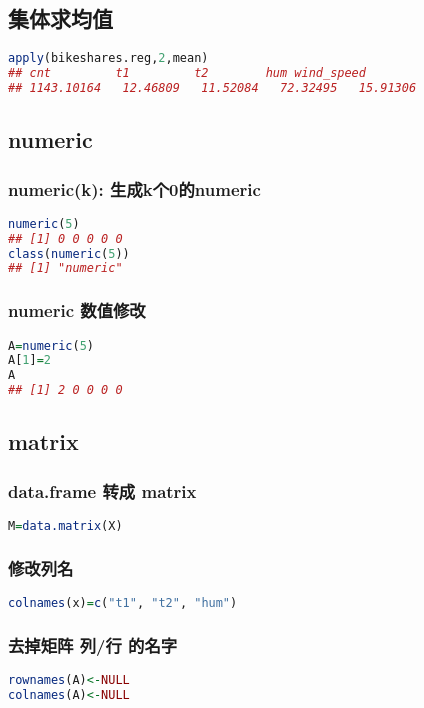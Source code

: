 \documentclass[11pt,a4paper]{article}
\begin{document}
\subsection{集体求均值}
\begin{lstlisting}[language=R]
apply(bikeshares.reg,2,mean)
## cnt         t1         t2        hum wind_speed 
## 1143.10164   12.46809   11.52084   72.32495   15.91306 
\end{lstlisting}





\subsection{numeric}
\subsubsection{numeric(k): 生成k个0的numeric}
\begin{lstlisting}[language=R]
numeric(5)
## [1] 0 0 0 0 0
class(numeric(5))
## [1] "numeric"
\end{lstlisting}
\subsubsection{numeric 数值修改}
\begin{lstlisting}[language=R]
A=numeric(5)
A[1]=2
A
## [1] 2 0 0 0 0
\end{lstlisting}
\subsection{matrix}
\subsubsection{data.frame 转成 matrix}
\begin{lstlisting}[language=R]
M=data.matrix(X)
\end{lstlisting}

\subsubsection{修改列名}
\begin{lstlisting}[language=R]
colnames(x)=c("t1", "t2", "hum")
\end{lstlisting}

\subsubsection{去掉矩阵 列/行 的名字}
\begin{lstlisting}[language=R]
rownames(A)<-NULL
colnames(A)<-NULL
\end{lstlisting}
\end{document}
